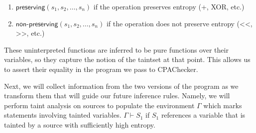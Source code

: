 \documentclass[letterpaper,twocolumn,10pt]{article}
\begin{document}
	\begin{enumerate}
		\item $\textsf{preserving}(s_1, s_2, \ldots, s_n)$ if the operation preserves entropy (+, XOR, etc.)
		\item $\textsf{non-preserving}(s_1, s_2, \ldots, s_n)$ if the operation does not preserve entropy (<<, >>, etc.)
	\end{enumerate}

	These uninterpreted functions are inferred to be pure functions over their variables, so they capture the notion of the taintset at that point. This allows us to assert their equality in the program we pass to CPAChecker. 

	Next, we will collect information from the two versions of the program as we transform them that will guide our future inference rules. Namely, we will perform taint analysis on sources to populate the environment $\Gamma$ which marks statements involving tainted variables. $\Gamma \vdash S_1$ if $S_1$ references a variable that is tainted by a source with sufficiently high entropy.  



	
\end{document}
